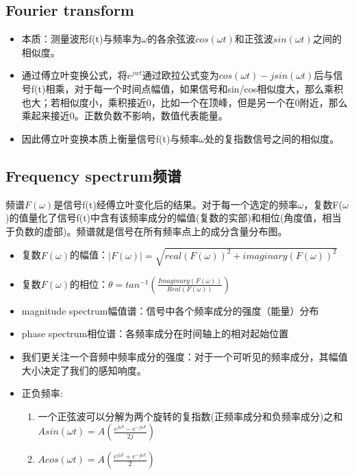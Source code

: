 \documentclass[UTF8]{ctexart}
\begin{document}
\subsection{Fourier transform}
\begin{itemize}
    \item 本质：测量波形f(t)与频率为$\omega$的各余弦波$cos(\omega t)$和正弦波$sin(\omega t)$之间的相似度。
    
    \item 通过傅立叶变换公式，将$e^{jwt}$通过欧拉公式变为$cos(\omega t)-jsin(\omega t)$后与信号f(t)相乘，对于每一个时间点幅值，如果信号和sin/cos相似度大，那么乘积也大；若相似度小，乘积接近0，比如一个在顶峰，但是另一个在0附近，那么乘起来接近0。正数负数不影响，数值代表能量。

    \item 因此傅立叶变换本质上衡量信号f(t)与频率$\omega$处的复指数信号之间的相似度。
\end{itemize}

\subsection{Frequency spectrum频谱}

频谱$F(\omega)$是信号f(t)经傅立叶变化后的结果。对于每一个选定的频率$\omega$，复数F($\omega$)的值量化了信号f(t)中含有该频率成分的幅值(复数的实部)和相位(角度值，相当于负数的虚部)。频谱就是信号在所有频率点上的成分含量分布图。

\begin{itemize}
    \item 复数$F(\omega)$的幅值：$|F(\omega)|=\sqrt{real(F(\omega))^2+imaginary(F(\omega))^2}$
    \item 复数$F(\omega)$的相位：$\theta=tan^{-1}(\frac{Imaginary(F(\omega))}{Real(F(\omega))})$
    \item magnitude spectrum幅值谱：信号中各个频率成分的强度（能量）分布
    \item phase spectrum相位谱：各频率成分在时间轴上的相对起始位置
    \item 我们更关注一个音频中频率成分的强度：对于一个可听见的频率成分，其幅值大小决定了我们的感知响度。
    \item 正负频率:
    \begin{enumerate}
        \item 一个正弦波可以分解为两个旋转的复指数(正频率成分和负频率成分)之和$Asin(\omega t)=A(\frac{e^{j\omega t}-e^{-j\omega t}}{2j})$ 
        \item $Acos(\omega t)=A(\frac{e^{j\omega t}+e^{-j\omega t}}{2})$ 

    \end{enumerate}
\end{itemize}
\end{document}
